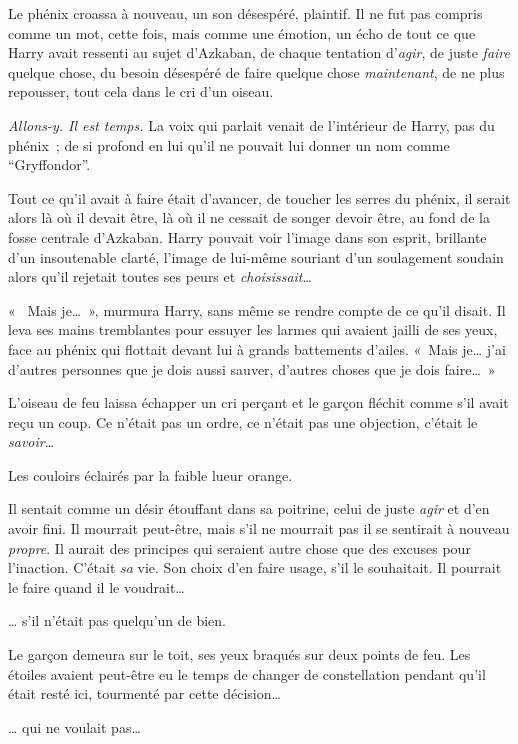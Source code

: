 Le phénix croassa à nouveau, un son désespéré, plaintif. Il ne fut pas compris comme un mot, cette fois, mais comme une émotion, un écho de tout ce que Harry avait ressenti au sujet d'Azkaban, de chaque tentation d'\emph{agir}, de juste \emph{faire} quelque chose, du besoin désespéré de faire quelque chose \emph{maintenant}, de ne plus repousser, tout cela dans le cri d'un oiseau.

\emph{Allons-y. Il est temps.} La voix qui parlait venait de l'intérieur de Harry, pas du phénix~; de si profond en lui qu'il ne pouvait lui donner un nom comme “Gryffondor”.

Tout ce qu'il avait à faire était d'avancer, de toucher les serres du phénix, il serait alors là où il devait être, là où il ne cessait de songer devoir être, au fond de la fosse centrale d'Azkaban. Harry pouvait voir l'image dans son esprit, brillante d'un insoutenable clarté, l'image de lui-même souriant d'un soulagement soudain alors qu'il rejetait toutes ses peurs et \emph{choisissait}…

«~ Mais je…~», murmura Harry, sans même se rendre compte de ce qu'il disait. Il leva ses mains tremblantes pour essuyer les larmes qui avaient jailli de ses yeux, face au phénix qui flottait devant lui à grands battements d'ailes. «~Mais je… j'ai d'autres personnes que je dois aussi sauver, d'autres choses que je dois faire…~»

L'oiseau de feu laissa échapper un cri perçant et le garçon fléchit comme s'il avait reçu un coup. Ce n'était pas un ordre, ce n'était pas une objection, c'était le \emph{savoir}…

Les couloirs éclairés par la faible lueur orange.

Il sentait comme un désir étouffant dans sa poitrine, celui de juste \emph{agir} et d'en avoir fini. Il mourrait peut-être, mais s'il ne mourrait pas il se sentirait à nouveau \emph{propre}. Il aurait des principes qui seraient autre chose que des excuses pour l'inaction. C'était \emph{sa} vie. Son choix d'en faire usage, s'il le souhaitait. Il pourrait le faire quand il le voudrait…

… s'il n'était pas quelqu'un de bien.

\later

Le garçon demeura sur le toit, ses yeux braqués sur deux points de feu. Les étoiles avaient peut-être eu le temps de changer de constellation pendant qu'il était resté ici, tourmenté par cette décision…

… qui ne voulait pas…

